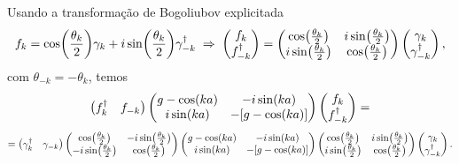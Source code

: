 \documentclass[a4paper,10pt]{article}
\begin{document}
Usando a transformação de Bogoliubov explicitada
$$
f_k = \cos(\frac{\theta_k}{2}) \gamma_k + i \sin(\frac{\theta_k}{2}) \gamma_{-k}^\dagger \; \Rightarrow \;
\begin{pmatrix}
f_k \\ f_{-k}^\dagger
\end{pmatrix}
=
\begin{pmatrix}
\cos(\frac{\theta_k}{2}) & i \sin(\frac{\theta_k}{2}) \\
i \sin(\frac{\theta_k}{2}) & \cos(\frac{\theta_k}{2})
\end{pmatrix}
\begin{pmatrix}
\gamma_k \\ \gamma_{-k}^\dagger
\end{pmatrix} ,
$$
com $\theta_{-k} = -\theta_k$, temos
$$
\begin{pmatrix}
f_k^\dagger & f_{-k}
\end{pmatrix}
\begin{pmatrix}
g-\cos(ka) & -i\sin(ka) \\
i\sin(ka) & -[g-\cos(ka)]
\end{pmatrix}
\begin{pmatrix}
f_k \\ f_{-k}^\dagger
\end{pmatrix}
=
$$
$$
=
\begin{pmatrix}
\gamma_k^\dagger & \gamma_{-k}
\end{pmatrix}
\begin{pmatrix}
\cos(\frac{\theta_k}{2}) & -i \sin(\frac{\theta_k}{2}) \\
-i \sin(\frac{\theta_k}{2}) & \cos(\frac{\theta_k}{2})
\end{pmatrix}
\begin{pmatrix}
g-\cos(ka) & -i\sin(ka) \\
i\sin(ka) & -[g-\cos(ka)]
\end{pmatrix}
\begin{pmatrix}
\cos(\frac{\theta_k}{2}) & i \sin(\frac{\theta_k}{2}) \\
i \sin(\frac{\theta_k}{2}) & \cos(\frac{\theta_k}{2})
\end{pmatrix}
\begin{pmatrix}
\gamma_k \\ \gamma_{-k}^\dagger
\end{pmatrix}.
$$
\end{document}
